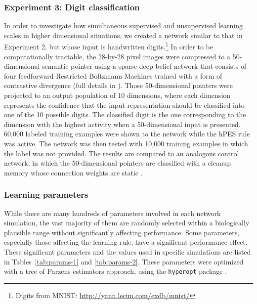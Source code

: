 \documentclass[10pt,letterpaper]{article}
\begin{document}
\subsubsection{Experiment 3: Digit classification}

In order to investigate how
simultaneous supervised and unsupervised learning
scales in higher dimensional situations,
we created a network similar to that in Experiment 2,
but whose input is handwritten digits.\footnote{Digits
  from MNIST: \url{http://yann.lecun.com/exdb/mnist/}}
In order to be computationally tractable,
the 28-by-28 pixel images were compressed to a 50-dimensional
semantic pointer using a sparse deep belief network
that consists of four feedforward
Restricted Boltzmann Machines
trained with a form of contrastive divergence
(full details in ).
Those 50-dimensional pointers were projected to
an output population of 10 dimensions,
where each dimension represents
the confidence that the input representation should
be classified into one of the 10 possible digits.
The classified digit is the one corresponding
to the dimension with the highest activity
when a 50-dimensional input is presented.
60,000 labeled training examples
were shown to the network while
the hPES rule was active.
The network was then tested with 10,000
training examples in which the label
was not provided.
The results are compared to an analogous control network,
in which the 50-dimensional pointers are classified
with a cleanup memory whose connection weights
are static \cite{Eliasmith2012}.

\subsubsection{Learning parameters}

While there are many hundreds of parameters
involved in each network simulation,
the vast majority of them are randomly selected
within a biologically plausible range
without significantly affecting performance.
Some parameters, especially those affecting
the learning rule, have a significant performance effect.
These significant parameters and the values
used in specific simulations are listed
in Tables~\ref{tab:params-1} and \ref{tab:params-2}.
These parameters were optimized
with a tree of Parzens estimators approach,
using the \texttt{hyperopt} package \cite{Bergstra2013}.
\end{document}
